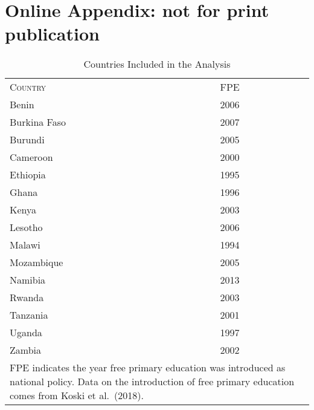 \documentclass[11pt]{article}
\begin{document}
\clearpage

\appendix
\renewcommand{\thepage}{\thesection\arabic{page}}
\setcounter{page}{1}
\section{Online Appendix:  not for print publication}
\renewcommand{\thefigure}{\thesection\arabic{figure}}
\renewcommand{\thetable}{\thesection\arabic{table}}
\setcounter{table}{0}
\setcounter{figure}{0}

\doublespacing 


\begin{table}[h]
	\begin{center}
		\caption{Countries Included in the Analysis} \label{tab:fpe-years}
		
		\medskip
		
		\begingroup
		\setlength{\tabcolsep}{6pt} %
		\renewcommand{\arraystretch}{1.4} %
		\begin{tabular}{ll} 
			 & \\	
			\hline \hline 	
			 \textsc{Country} & \textsc{FPE} \\ 
			\hline
			Benin	& 2006 \\
			Burkina Faso	& 2007 \\
			Burundi 	& 2005 \\
			Cameroon	& 2000 \\
			Ethiopia 	& 1995 \\
			Ghana	& 1996 \\ 
			Kenya	& 2003 \\ 
			Lesotho	& 2006 \\
			Malawi	& 1994 \\
			Mozambique	& 2005 \\
			Namibia	& 2013	\\
			Rwanda	& 2003 \\
			Tanzania	& 2001 \\
			Uganda	& 1997 \\
			Zambia	& 2002 \\
			\hline
			\multicolumn{2}{p{3.6cm}}{\footnotesize{\textsc{FPE} indicates the year free primary education was introduced as national policy.  Data on the introduction of free primary education comes from Koski et al.~(2018).}} \\
		\end{tabular}
		\endgroup
	\end{center}
\end{table}
\end{document}
